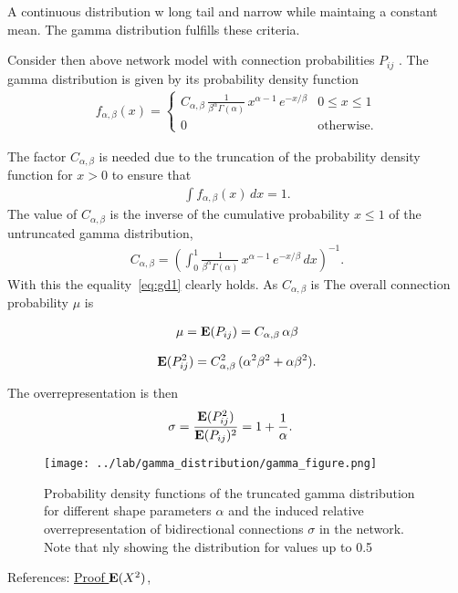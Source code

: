 
A continuous distribution w long tail and narrow while maintaing a constant mean. The gamma distribution fulfills these criteria.

Consider then above network model with connection probabilities $P_{ij}$ . The gamma distribution is given by its probability density function 
%
\begin{align}
  f_{\alpha,\beta}(x) = \begin{cases} C_{\alpha, \beta}\,
\frac{1}{\beta^{\alpha}\Gamma(\alpha)}\, x^{\alpha-1}\,e^{-x/\beta} & 0 \leq x \leq 1 \\
0 & \text{otherwise}.
\end{cases}
\end{align}

The factor $C_{\alpha,\beta}$ is needed due to the truncation of the probability density function for $x>0$ to ensure that
\begin{align}
  \int f_{\alpha,\beta}(x) \,dx = 1. \label{eq:gd1}
\end{align}
The value of $C_{\alpha,\beta}$ is the inverse of the cumulative probability $x \leq 1$ of the untruncated gamma distribution,
\begin{align}
  C_{\alpha,\beta} = \left(\int_0^{1} \frac{1}{\beta^{\alpha}\Gamma(\alpha)}\, x^{\alpha-1}\,e^{-x/\beta} \, dx \right)^{-1}.
\end{align}
With this the equality~\eqref{eq:gd1} clearly holds. As $C_{\alpha,\beta}$ is The overall connection probability $\mu$ is

\begin{align}
 \mu = \operatorname{\mathbf{E}}(P_{ij}) = C_{\alpha,\beta} \, \alpha \beta
\end{align}

\begin{align}
  \operatorname{\mathbf{E}}(P_{ij}^2) = C_{\alpha,\beta}^2 \, (\alpha^2 \beta^2 + \alpha \beta^2).
\end{align}

The overrepresentation is then
\begin{align}
  \sigma & = \frac{\E(P_{ij}^2)}{\E(P_{ij})^2} =%
  1 + \frac{1}{\alpha}.
\end{align}


\begin{figure}[h!]
\centering
\texttt{[image: ../lab/gamma\_distribution/gamma\_figure.png]}
\caption{Probability density functions of the truncated gamma distribution for different shape parameters $\alpha$ and the induced relative overrepresentation of bidirectional connections $\sigma$ in the network. Note that nly showing the distribution for values up to 0.5}
\end{figure}


References: \href{http://herbsusmann.com/distributions/gamma-distribution-variance-proof.html}{Proof $\operatorname{\mathbf{E}}(X^2)$}, 

